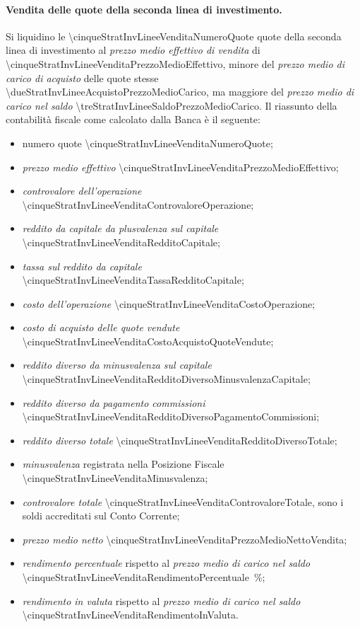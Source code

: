\documentclass[12pt,a4paper]{article}
\newcommand{\Eur}[1]{\SI{#1}{\text{\euro{}}}}
\begin{document}
\paragraph{Vendita delle quote della seconda linea di investimento.}
Si  liquidino   le  \num{\cinqueStratInvLineeVenditaNumeroQuote}   quote  della  seconda   linea  di
investimento       al       \emph{prezzo       medio      effettivo       di       vendita}       di
\Eur{\cinqueStratInvLineeVenditaPrezzoMedioEffettivo}, minore  del \emph{prezzo  medio di  carico di
   acquisto} delle  quote stesse  \Eur{\dueStratInvLineeAcquistoPrezzoMedioCarico}, ma  maggiore del
\emph{prezzo medio di carico nel saldo} \Eur{\treStratInvLineeSaldoPrezzoMedioCarico}.  Il riassunto
della contabilità fiscale come calcolato dalla Banca è il seguente:
\begin{itemize}
\item numero quote \num{\cinqueStratInvLineeVenditaNumeroQuote};
\item \emph{prezzo medio effettivo} \Eur{\cinqueStratInvLineeVenditaPrezzoMedioEffettivo};
\item \emph{controvalore dell'operazione} \Eur{\cinqueStratInvLineeVenditaControvaloreOperazione};
\item \emph{reddito da capitale da plusvalenza sul capitale} \Eur{\cinqueStratInvLineeVenditaRedditoCapitale};
\item \emph{tassa sul reddito da capitale} \Eur{\cinqueStratInvLineeVenditaTassaRedditoCapitale};
\item \emph{costo dell'operazione} \Eur{\cinqueStratInvLineeVenditaCostoOperazione};
\item \emph{costo di acquisto delle quote vendute} \Eur{\cinqueStratInvLineeVenditaCostoAcquistoQuoteVendute};
\item \emph{reddito diverso da minusvalenza sul capitale} \Eur{\cinqueStratInvLineeVenditaRedditoDiversoMinusvalenzaCapitale};
\item \emph{reddito diverso da pagamento commissioni} \Eur{\cinqueStratInvLineeVenditaRedditoDiversoPagamentoCommissioni};
\item \emph{reddito diverso totale} \Eur{\cinqueStratInvLineeVenditaRedditoDiversoTotale};
\item \emph{minusvalenza} registrata nella Posizione Fiscale \Eur{\cinqueStratInvLineeVenditaMinusvalenza};
\item \emph{controvalore totale}  \Eur{\cinqueStratInvLineeVenditaControvaloreTotale}, sono i soldi
  accreditati sul Conto Corrente;
\item \emph{prezzo medio netto} \Eur{\cinqueStratInvLineeVenditaPrezzoMedioNettoVendita};
\item  \emph{rendimento   percentuale}  rispetto  al   \emph{prezzo  medio  di  carico   nel  saldo}
  \SI{\cinqueStratInvLineeVenditaRendimentoPercentuale}{\percent};
\item  \emph{rendimento   in  valuta}  rispetto   al  \emph{prezzo   medio  di  carico   nel  saldo}
  \Eur{\cinqueStratInvLineeVenditaRendimentoInValuta}.
\end{itemize}
\end{document}
